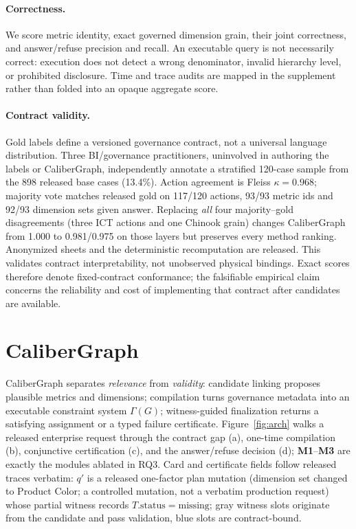 \documentclass[letterpaper]{article}
\begin{document}
\paragraph{Correctness.}
We score metric identity, exact governed dimension grain, their joint correctness, and answer/refuse precision and recall. An executable query is not necessarily correct: execution does not detect a wrong denominator, invalid hierarchy level, or prohibited disclosure. Time and trace audits are mapped in the supplement rather than folded into an opaque aggregate score.

\paragraph{Contract validity.}
Gold labels define a versioned governance contract, not a universal language distribution. Three BI/governance practitioners, uninvolved in authoring the labels or CaliberGraph, independently annotate a stratified 120-case sample from the 898 released base cases (13.4\%). Action agreement is Fleiss $\kappa{=}0.968$; majority vote matches released gold on 117/120 actions, 93/93 metric ids and 92/93 dimension sets given answer. Replacing \emph{all} four majority--gold disagreements (three ICT actions and one Chinook grain) changes CaliberGraph from 1.000 to 0.981/0.975 on those layers but preserves every method ranking. Anonymized sheets and the deterministic recomputation are released. This validates contract interpretability, not unobserved physical bindings. Exact scores therefore denote fixed-contract conformance; the falsifiable empirical claim concerns the reliability and cost of implementing that contract after candidates are available.

\section{CaliberGraph}

CaliberGraph separates \emph{relevance} from \emph{validity}: candidate linking proposes plausible metrics and dimensions; compilation turns governance metadata into an executable constraint system $\Gamma(G)$; witness-guided finalization returns a satisfying assignment or a typed failure certificate. Figure~\ref{fig:arch} walks a released enterprise request through the contract gap (a), one-time compilation (b), conjunctive certification (c), and the answer/refuse decision (d); \textbf{M1}--\textbf{M3} are exactly the modules ablated in RQ3. Card and certificate fields follow released traces verbatim: $q'$ is a released one-factor plan mutation (dimension set changed to Product Color; a controlled mutation, not a verbatim production request) whose partial witness records $T.\mathrm{status}{=}\mathrm{missing}$; gray witness slots originate from the candidate and pass validation, blue slots are contract-bound.
\end{document}
